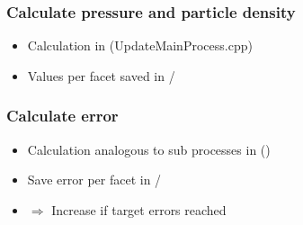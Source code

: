 \subsubsection{Calculate pressure and particle density}
\begin{itemize}[noitemsep,topsep=0pt, partopsep=0pt]
\item Calculation in  (UpdateMainProcess.cpp)
\item Values per facet saved in /
\end{itemize}

\subsubsection{Calculate error}
\begin{itemize}[noitemsep,topsep=0pt, partopsep=0pt]
\item Calculation analogous to sub processes in  ()
\item Save error per facet in /
\item[]$\Rightarrow$ Increase  if target errors reached
\end{itemize}


